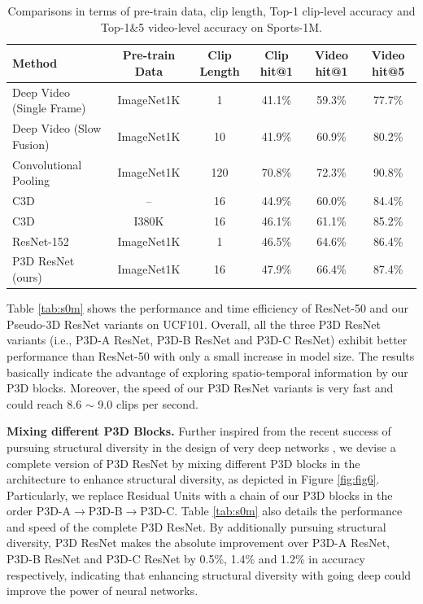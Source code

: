 \documentclass[10pt,twocolumn,letterpaper]{article}
\begin{document}
\begin{table}
\centering
\small
\caption{\small Comparisons in terms of pre-train data, clip length, Top-1 clip-level accuracy and Top-1\&5 video-level accuracy on Sports-1M.}
\begin{tabular}{l|c|c|c|c|c} \hline
\textbf{Method}                                     & \textbf{Pre-train Data} &\textbf{Clip Length} & \textbf{Clip hit@1}    & \textbf{Video hit@1}  & \textbf{Video hit@5} \\ \hline
Deep Video (Single Frame) \cite{karpathy2014large}  & ImageNet1K     & 1           & 41.1\%        & 59.3\%       & 77.7\%      \\
Deep Video (Slow Fusion) \cite{karpathy2014large}   & ImageNet1K     & 10          & 41.9\%        & 60.9\%       & 80.2\%      \\
Convolutional Pooling \cite{yue2015beyond}          & ImageNet1K     & 120         & 70.8\%        & 72.3\%       & 90.8\%      \\
C3D \cite{tran2015learning}                         & --             & 16          & 44.9\%        & 60.0\%       & 84.4\%      \\
C3D \cite{tran2015learning}                         & I380K          & 16          & 46.1\%        & 61.1\%       & 85.2\%      \\ \hline
ResNet-152 \cite{he2015deep}             & ImageNet1K     & 1           & 46.5\%        & 64.6\%       & 86.4\%      \\
P3D ResNet (ours)             & ImageNet1K     & 16          & 47.9\%        & 66.4\%       & 87.4\%      \\ \hline
\end{tabular}
\label{tab:s1m}
\vspace{-0.18in}
\end{table}

Table \ref{tab:s0m} shows the performance and time efficiency of ResNet-50 and our Pseudo-3D ResNet variants on UCF101. Overall, all the three P3D ResNet variants (i.e., P3D-A ResNet, P3D-B ResNet and P3D-C ResNet) exhibit better performance than ResNet-50 with only a small increase in model size. The results basically indicate the advantage of exploring spatio-temporal information by our P3D blocks. Moreover, the speed of our P3D ResNet variants is very fast and could reach 8.6 $\sim$ 9.0 clips per second.



\textbf{Mixing different P3D Blocks.}
Further inspired from the recent success of pursuing structural diversity in the design of very deep networks \cite{zhang2016polynet}, we devise a complete version of P3D ResNet by mixing different P3D blocks in the architecture to enhance structural diversity, as depicted in Figure \ref{fig:fig6}. Particularly, we replace Residual Units with a chain of our P3D blocks in the order P3D-A$\to$P3D-B$\to$P3D-C. Table \ref{tab:s0m} also details the performance and speed of the complete P3D ResNet. By additionally pursuing structural diversity, P3D ResNet makes the absolute improvement over P3D-A ResNet, P3D-B ResNet and P3D-C ResNet by 0.5\%, 1.4\% and 1.2\% in accuracy respectively, indicating that enhancing structural diversity with going deep could improve the power of neural networks.
\end{document}
